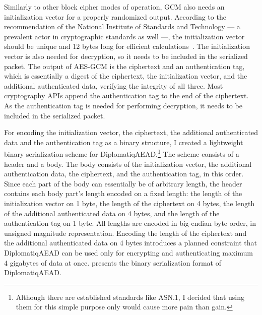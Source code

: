Similarly to other block cipher modes of operation, GCM also needs an initialization vector for a properly randomized output. According to the recommendation of the National Institute of Standards and Technology — a prevalent actor in cryptographic standards as well —, the initialization vector should be unique and 12 bytes long for efficient calculations~\cite{dworkin2007sp}. The initialization vector is also needed for decryption, so it needs to be included in the serialized packet. The output of AES-GCM is the ciphertext and an authentication tag, which is essentially a digest of the ciphertext, the initialization vector, and the additional authenticated data, verifying the integrity of all three. Most cryptography APIs append the authentication tag to the end of the ciphertext. As the authentication tag is needed for performing decryption, it needs to be included in the serialized packet.

For encoding the initialization vector, the ciphertext, the additional authenticated data and the authentication tag as a binary structure, I created a lightweight binary serialization scheme for DiplomatiqAEAD.\footnote{Although there are established standards like ASN.1, I decided that using them for this simple purpose only would cause more pain than gain.} The scheme consists of a header and a body. The body consists of the initialization vector, the additional authentication data, the ciphertext, and the authentication tag, in this order. Since each part of the body can essentially be of arbitrary length, the header contains each body part's length encoded on a fixed length: the length of the initialization vector on 1 byte, the length of the ciphertext on 4 bytes, the length of the additional authenticated data on 4 bytes, and the length of the authentication tag on 1 byte. All lengths are encoded in big-endian byte order, in unsigned magnitude representation. Encoding the length of the ciphertext and the additional authenticated data on 4 bytes introduces a planned constraint that DiplomatiqAEAD can be used only for encrypting and authenticating maximum 4 gigabytes of data at once.  presents the binary serialization format of DiplomatiqAEAD.

